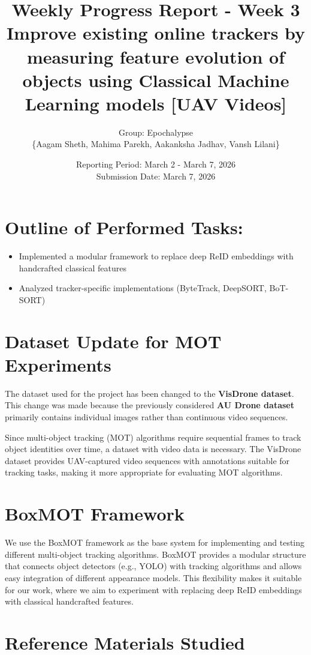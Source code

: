 \documentclass[11pt,a4paper]{article}
\title{\textbf{Weekly Progress Report - Week 3} \\
	\large Improve existing online trackers by measuring feature evolution of objects using
	Classical Machine Learning models [UAV Videos]}
\author{Group: Epochalypse\\\{Aagam Sheth, Mahima Parekh, Aakanksha Jadhav, Vansh Lilani\}}
\date{Reporting Period: March 2 - March 7, 2026 \\
	Submission Date: March 7, 2026}
\begin{document}
	
	\maketitle
	
	\section*{Outline of Performed Tasks:}
	\begin{itemize}[leftmargin=*]
		\item Implemented a modular framework to replace deep ReID embeddings with handcrafted classical features
		\item Analyzed tracker-specific implementations (ByteTrack, DeepSORT, BoT-SORT)
	\end{itemize}
	
	\section*{Dataset Update for MOT Experiments}
	The dataset used for the project has been changed to the \textbf{VisDrone dataset}. 
	This change was made because the previously considered \textbf{AU Drone dataset} primarily contains individual images rather than continuous video sequences.
	
	Since multi-object tracking (MOT) algorithms require sequential frames to track object identities over time, a dataset with video data is necessary. 
	The VisDrone dataset provides UAV-captured video sequences with annotations suitable for tracking tasks, making it more appropriate for evaluating MOT algorithms.
	
	\section*{BoxMOT Framework}
	We use the BoxMOT framework as the base system for implementing and testing different multi-object tracking algorithms. 
	BoxMOT provides a modular structure that connects object detectors (e.g., YOLO) with tracking algorithms and allows easy 
	integration of different appearance models. This flexibility makes it suitable for our work, where we aim to experiment 
	with replacing deep ReID embeddings with classical handcrafted features.
	
	\section*{Reference Materials Studied}
	
\end{document}
